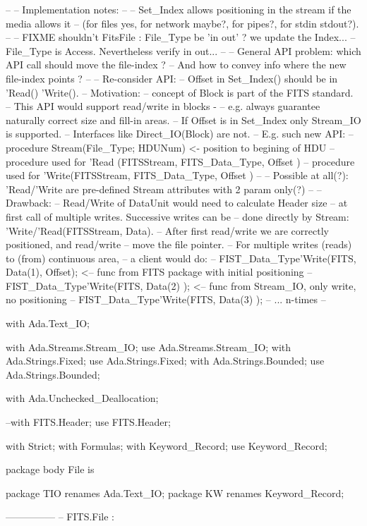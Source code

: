 --
-- Implementation notes:
--
-- Set_Index allows positioning in the stream if the media allows it
-- (for files yes, for network maybe?, for pipes?, for stdin stdout?).
--
-- FIXME shouldn't FitsFile : File_Type be 'in out' ? we update the Index...
-- File_Type is Access. Nevertheless verify in out...
--
-- General API problem: which API call should move the file-index ?
--   And how to convey info where the new file-index points ?
--
-- Re-consider API:
--   Offset in Set_Index() should be in 'Read() 'Write().
--   Motivation:
--   concept of Block is part of the FITS standard.
--   This API would support read/write in blocks -
--   e.g. always guarantee naturally correct size and fill-in areas.
--   If Offset is in Set_Index only Stream_IO is supported.
--   Interfaces like Direct_IO(Block) are not.
--   E.g. such new API:
--   procedure Stream(File_Type; HDUNum) <- position to begining of HDU
--   procedure used for 'Read (FITSStream, FITS_Data_Type, Offset )
--   procedure used for 'Write(FITSStream, FITS_Data_Type, Offset )
--
--   Possible at all(?): 'Read/'Write are pre-defined Stream attributes with 2 param only(?)
--
--   Drawback:
--   Read/Write of DataUnit would need to calculate Header size
--   at first call of multiple writes. Successive writes can be
--   done directly by Stream: 'Write/'Read(FITSStream, Data).
--   After first read/write we are correctly positioned, and read/write
--   move the file pointer.
--   For multiple writes (reads) to (from) continuous area,
--   a client would do:
--   FIST_Data_Type'Write(FITS, Data(1), Offset); <-- func from FITS package with initial positioning
--   FIST_Data_Type'Write(FITS, Data(2) );        <-- func from Stream_IO, only write, no positioning
--   FIST_Data_Type'Write(FITS, Data(3) );
--   ... n-times
--

with Ada.Text_IO;


with Ada.Streams.Stream_IO; use Ada.Streams.Stream_IO;
with Ada.Strings.Fixed;     use Ada.Strings.Fixed;
with Ada.Strings.Bounded;   use Ada.Strings.Bounded;

with Ada.Unchecked_Deallocation;

--with FITS.Header; use FITS.Header;

with Strict;
with Formulas;
with Keyword_Record;  use Keyword_Record;


package body File is

	package TIO renames Ada.Text_IO;
	package KW renames Keyword_Record;
   
   ---------------
   -- FITS.File :

